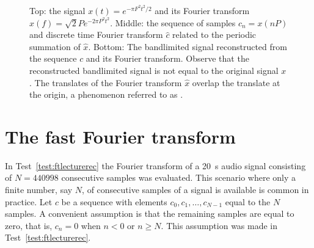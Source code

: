\begin{figure}[p]
{  \;\;
}
\caption{Top: the signal $x(t) = e^{-\pi F^2 t^2/2}$ and its Fourier transform $\hat{x}(f) = \sqrt{2}Pe^{-2\pi P^2 t^2}$.  Middle: the sequence of samples $c_n = x(nP)$ and discrete time Fourier transform $\hat{c}$ related to the periodic summation of $\hat{x}$.  Bottom: The bandlimited signal reconstructed from the sequence $c$ and its Fourier transform.  Observe that the reconstructed bandlimited signal is not equal to the original signal $x$.  The translates of the Fourier transform $\hat{x}$ overlap the translate at the origin, a phenomenon referred to as .} \label{fig:aliasingexp}
\end{figure}



\section{The fast Fourier transform}\label{sec:fast-four-transf}

In Test~\ref{test:ftlecturerec} the Fourier transform of a \SI{20}{\second} audio signal consisting of $N=440998$ consecutive samples was evaluated.  This scenario where only a finite number, say $N$, of consecutive samples of a signal is available is common in practice.  Let $c$ be a sequence with elements $c_0,c_1,\dots, c_{N-1}$ equal to the $N$ samples.  A convenient assumption is that the remaining samples are equal to zero, that is, $c_n = 0$ when $n < 0$ or $n \geq N$.  This assumption was made in Test~\ref{test:ftlecturerec}.

